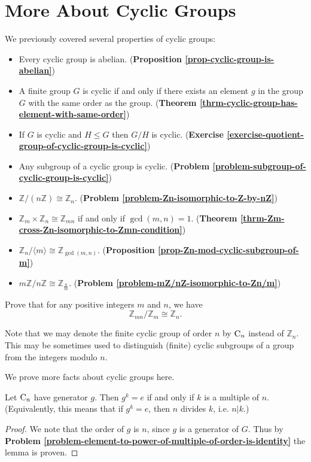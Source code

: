 \section{More About Cyclic Groups}
We previously covered several properties of cyclic groups:
\begin{itemize}
    \item Every cyclic group is abelian. (\textbf{Proposition \ref{prop-cyclic-group-is-abelian}})
    \item A finite group $G$ is cyclic if and only if there exists an element $g$ in the group $G$ with the same order as the group. (\textbf{Theorem \ref{thrm-cyclic-group-has-element-with-same-order}})
    \item If $G$ is cyclic and $H \leq G$ then $G/H$ is cyclic. (\textbf{Exercise \ref{exercise-quotient-group-of-cyclic-group-is-cyclic}})
    \item Any subgroup of a cyclic group is cyclic. (\textbf{Problem \ref{problem-subgroup-of-cyclic-group-is-cyclic}})
    \item $\mathbb{Z} / (n\mathbb{Z}) \cong \mathbb{Z}_n$. (\textbf{Problem \ref{problem-Zn-isomorphic-to-Z-by-nZ}})
    \item $\mathbb{Z}_m \times \mathbb{Z}_n \cong \mathbb{Z}_{mn}$ if and only if $\gcd(m,n) = 1$. (\textbf{Theorem \ref{thrm-Zm-cross-Zn-isomorphic-to-Zmn-condition}})
    \item $\mathbb{Z}_n / \langle m \rangle \cong \mathbb{Z}_{\gcd(m,n)}$. (\textbf{Proposition \ref{prop-Zn-mod-cyclic-subgroup-of-m}})
    \item $m\mathbb{Z} / n\mathbb{Z} \cong \mathbb{Z}_{\frac nm}$. (\textbf{Problem \ref{problem-mZ/nZ-isomorphic-to-Zn/m}})
\end{itemize}

\begin{exercise}\label{exercise-Zmn-mod-Zn-cong-Zn}
    Prove that for any positive integers $m$ and $n$, we have
    \[
        \mathbb{Z}_{mn} / \mathbb{Z}_m \cong \mathbb{Z}_n.
    \]
\end{exercise}

Note that we may denote the finite cyclic group of order $n$ by $\mathrm{C}_{n}$ instead of $\mathbb{Z}_n$. This may be sometimes used to distinguish (finite) cyclic subgroups of a group from the integers modulo $n$.

We prove more facts about cyclic groups here.
\begin{lemma}\label{lemma-order-of-an-element-that-is-equivalent-to-identity}
    Let $\mathrm{C}_{n}$ have generator $g$. Then $g^k = e$ if and only if $k$ is a multiple of $n$.\newline
    (Equivalently, this means that if $g^k = e$, then $n$ divides $k$, i.e. $n\vert k$.)
\end{lemma}
\begin{proof}
    We note that the order of $g$ is $n$, since $g$ is a generator of $G$. Thus by \textbf{Problem \ref{problem-element-to-power-of-multiple-of-order-is-identity}} the lemma is proven.
\end{proof}

